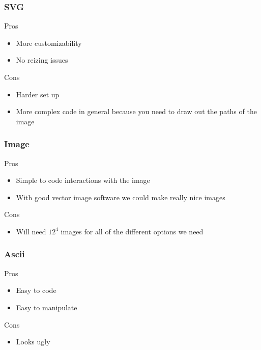\documentclass[onecolumn, draftclsnofoot,10pt, compsoc]{IEEEtran}
\begin{document}
\subsubsection{SVG}

Pros

\begin{itemize}
    \item More customizability
    \item No reizing issues
\end{itemize}

Cons

\begin{itemize}
    \item Harder set up
    \item More complex code in general because you need to draw out the paths of the image
\end{itemize}

\subsubsection{Image}

Pros

\begin{itemize}
    \item Simple to code interactions with the image
    \item With good vector image software we could make really nice images
\end{itemize}

Cons

\begin{itemize}
    \item Will need $12^4$ images for all of the different options we need
\end{itemize}

\subsubsection{Ascii}

Pros

\begin{itemize}
    \item Easy to code
    \item Easy to manipulate
\end{itemize}

Cons

\begin{itemize}
    \item Looks ugly
\end{itemize}
\end{document}
